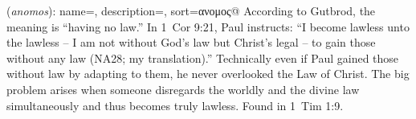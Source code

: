 \item[Lawless,]

(\textit{anomos}):
{
    name=,
    description={},
    sort=ανομος@
}
According to Gutbrod, the meaning is ``having no law.'' In 1~Cor 9:21, Paul instructs: ``I become lawless unto the lawless -- I am not without God's law but Christ's legal -- to gain those without any law (NA28; my translation).'' Technically even if Paul gained those without law by adapting to them, he never overlooked the Law of Christ. The big problem arises when someone disregards the worldly and the divine law simultaneously and thus becomes truly lawless.
Found in 1~Tim 1:9.

